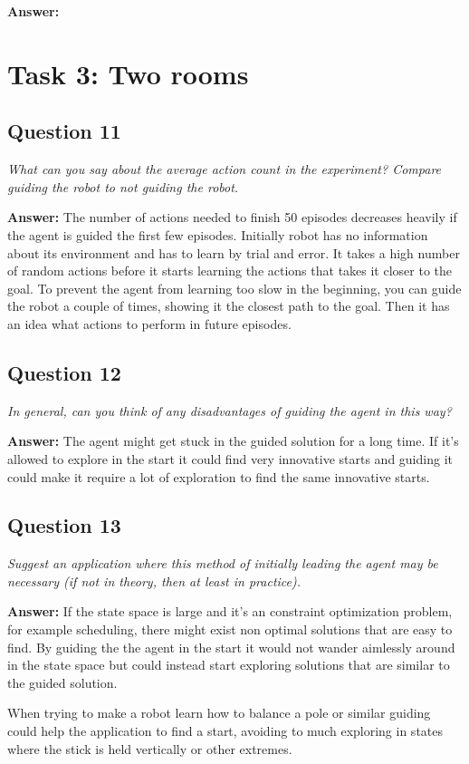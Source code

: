 \documentclass[a4paper]{article}
\begin{document}
\textbf{Answer:} 

\section{Task 3: Two rooms}

\subsection*{Question 11}
\emph{What can you say about the average action count in the experiment? Compare guiding the robot to not guiding the robot.}

\textbf{Answer:} 
The number of actions needed to finish 50 episodes decreases heavily if the agent is guided the first few episodes. Initially robot has no information about its environment and has to learn by trial and error. It takes a high number of random actions before it starts learning the actions that takes it closer to the goal. To prevent the agent from learning too slow in the beginning, you can guide the robot a couple of times, showing it the closest path to the goal. Then it has an idea what actions to perform in future episodes. 

\subsection*{Question 12}
\emph{In general, can you think of any disadvantages of guiding the
agent in this way?} 

\textbf{Answer:} The agent might get stuck in the guided solution for a long time. If it's allowed to explore in the start it could find very innovative starts and guiding it could make it require a lot of exploration to find the same innovative starts. 

\subsection*{Question 13}
\emph{Suggest an application where this method of initially leading the
agent may be necessary (if not in theory, then at least in practice).}

\textbf{Answer:} If the state space is large and it's an constraint optimization problem, for example scheduling, there might exist non optimal solutions that are easy to find. By guiding the the agent in the start it would not wander aimlessly around in the state space but could instead start exploring solutions that are similar to the guided solution. 

When trying to make a robot learn how to balance a pole or similar guiding could help the application to find a start, avoiding to much exploring in states where the stick is held vertically or other extremes.
\end{document}
